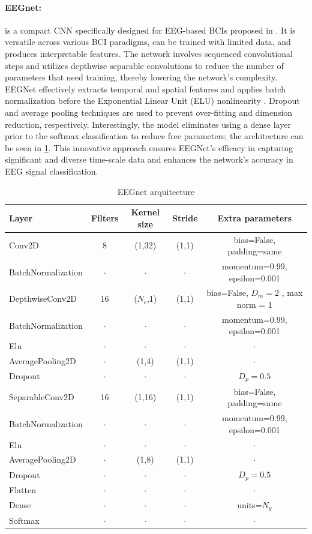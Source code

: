 \paragraph{EEGnet:} is a compact CNN specifically designed for EEG-based BCIs proposed in \cite{lawhern2018eegnet}. It is versatile across various BCI paradigms, can be trained with limited data, and produces interpretable features. The network involves sequenced convolutional steps and utilizes depthwise separable convolutions to reduce the number of parameters that need training, thereby lowering the network's complexity. EEGNet effectively extracts temporal and spatial features and applies batch normalization before the Exponential Linear Unit (ELU) nonlinearity . Dropout and average pooling techniques are used to prevent over-fitting and dimension reduction, respectively. Interestingly, the model eliminates using a dense layer prior to the softmax classification to reduce free parameters; the architecture can be seen in \cref{table:eegnet}. This innovative approach ensures EEGNet's efficacy in capturing significant and diverse time-scale data and enhances the network's accuracy in EEG signal classification.

\begin{table}[h!]
\caption{EEGnet arquitecture}\label{table:eegnet}
\centering
\begin{tabular}{l|c|c|c|c}
\hline
\textbf{Layer} & \textbf{Filters} & \textbf{Kernel size} & \textbf{Stride} & \textbf{Extra parameters}\\
\hline
Conv2D & 8 & (1,32) & (1,1) & bias=False, padding=same\\ 
BatchNormalization & $\cdot$ & $\cdot$ & $\cdot$ & momentum=0.99, epsilon=0.001\\ 
\hline
DepthwiseConv2D & 16 & ($N_c$,1) & (1,1) & bias=False, $D_m= 2$ , max norm = 1  \\ 
BatchNormalization & $\cdot$ & $\cdot$ & $\cdot$ & momentum=0.99, epsilon=0.001\\ 
Elu & $\cdot$ & $\cdot$ & $\cdot$ & $\cdot$\\ 
AveragePooling2D & $\cdot$ & (1,4) & (1,1) & $\cdot$ \\ 
Dropout & $\cdot$ & $\cdot$ & $\cdot$ & $D_p = 0.5$\\
\hline
SeparableConv2D & 16 & (1,16) & (1,1) & bias=False, padding=same\\
BatchNormalization & $\cdot$ & $\cdot$ & $\cdot$ & momentum=0.99, epsilon=0.001\\
Elu & $\cdot$ & $\cdot$ & $\cdot$& $\cdot$\\
AveragePooling2D & $\cdot$ &(1,8) & (1,1)& $\cdot$\\
Dropout & $\cdot$ & $\cdot$ & $\cdot$ & $D_p = 0.5$\\
\hline
Flatten & $\cdot$ & $\cdot$ & $\cdot$ & $\cdot$\\
Dense & $\cdot$ & $\cdot$ & $\cdot$ & units=$N_y$\\
Softmax & $\cdot$ & $\cdot$ & $\cdot$ & $\cdot$\\
\hline
\end{tabular}
\end{table}

